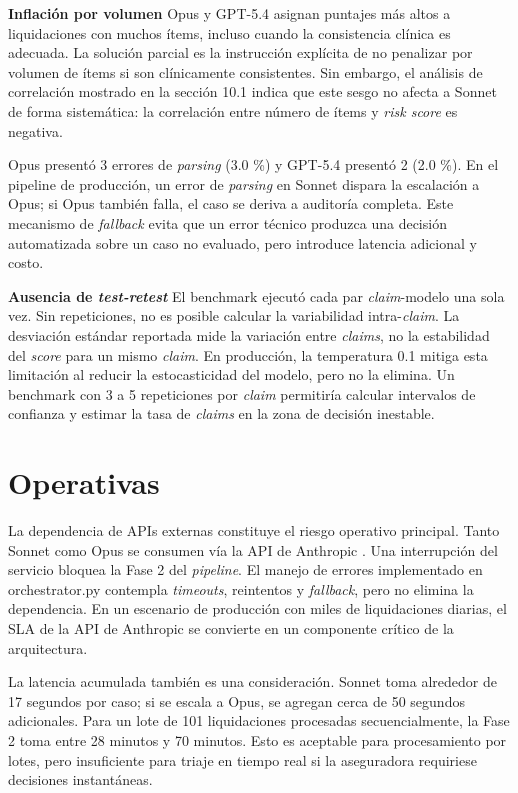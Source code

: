 \textbf{Inflación por volumen} Opus y GPT-5.4 asignan puntajes más altos a liquidaciones con muchos ítems, incluso cuando la consistencia clínica es adecuada. La solución parcial es la instrucción explícita de no penalizar por volumen de ítems si son clínicamente consistentes. Sin embargo, el análisis de correlación mostrado en la sección 10.1 indica que este sesgo no afecta a Sonnet de forma sistemática: la correlación entre número de ítems y \textit{risk score} es negativa.

Opus presentó 3 errores de \textit{parsing} (3.0 \%) y GPT-5.4 presentó 2 (2.0 \%). En el pipeline de producción, un error de \textit{parsing} en Sonnet dispara la escalación a Opus; si Opus también falla, el caso se deriva a auditoría completa. Este mecanismo de \textit{fallback} evita que un error técnico produzca una decisión automatizada sobre un caso no evaluado, pero introduce latencia adicional y costo.

\textbf{Ausencia de \textit{test-retest}} El benchmark ejecutó cada par \textit{claim}-modelo una sola vez. Sin repeticiones, no es posible calcular la variabilidad intra-\textit{claim}. La desviación estándar reportada mide la variación entre \textit{claims}, no la estabilidad del \textit{score} para un mismo \textit{claim}. En producción, la temperatura 0.1 mitiga esta limitación al reducir la estocasticidad del modelo, pero no la elimina. Un benchmark con 3 a 5 repeticiones por \textit{claim} permitiría calcular intervalos de confianza y estimar la tasa de \textit{claims} en la zona de decisión inestable.

\section{Operativas}

La dependencia de APIs externas constituye el riesgo operativo principal. Tanto Sonnet como Opus se consumen vía la API de Anthropic \cite{anthropic2025claude}. Una interrupción del servicio bloquea la Fase 2 del \textit{pipeline}. El manejo de errores implementado en orchestrator.py contempla \textit{timeouts}, reintentos y \textit{fallback}, pero no elimina la dependencia. En un escenario de producción con miles de liquidaciones diarias, el SLA de la API de Anthropic se convierte en un componente crítico de la arquitectura.

La latencia acumulada también es una consideración. Sonnet toma alrededor de 17 segundos por caso; si se escala a Opus, se agregan cerca de 50 segundos adicionales. Para un lote de 101 liquidaciones procesadas secuencialmente, la Fase 2 toma entre 28 minutos y 70 minutos. Esto es aceptable para procesamiento por lotes, pero insuficiente para triaje en tiempo real si la aseguradora requiriese decisiones instantáneas.

